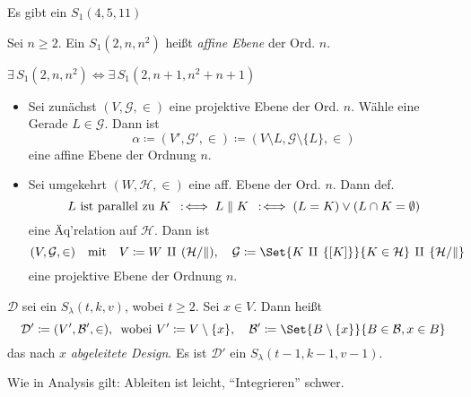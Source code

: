 \documentclass{cheat-sheet}
\newcommand{\Design}{\mathcal{D}} %
\newcommand{\Blocks}{\mathcal{B}} %
\newcommand{\Geraden}{\mathcal{G}} %
\begin{document}
\begin{satz}
  Es gibt ein $S_1(4, 5, 11)$
\end{satz}


\begin{defn}
  Sei $n \geq 2$.
  Ein $S_1(2, n, n^2)$ heißt \emph{affine Ebene} der Ord. $n$.
\end{defn}

\begin{satz}
  $\exists \, S_1(2, n, n^2) \iff \exists \, S_1(2, n+1, n^2 + n + 1)$
\end{satz}

\begin{konstr}
  \begin{itemize}
    \item Sei zunächst $(V, \Geraden, \in)$ eine projektive Ebene der Ord. $n$.
    Wähle eine Gerade $L \in \Geraden$.
    Dann ist
    \[ \alpha \coloneqq (V', \Geraden', \in) \coloneqq (V \setminus L, \Geraden \setminus \{ L \}, \in) \]
    eine affine Ebene der Ordnung $n$. \\
    \item Sei umgekehrt $(W, \mathcal{H}, \in)$ eine aff. Ebene der Ord. $n$.
    Dann def.
    \[ L \text{ ist parallel zu } K \enspace:\!\iff L \parallel K \enspace:\!\iff (L = K) \vee (L \cap K = \emptyset) \]
    eine Äq'relation auf $\mathcal{H}$.
    Dann ist
    \[
      (V, \Geraden, \in)
      \quad \text{mit} \quad
      V \coloneqq W \,\amalg\, (\mathcal{H}/{\parallel}), \quad
      \Geraden \coloneqq \Set{K \,\amalg\, \{ [K] \}}{K \in \mathcal{H}} \,\amalg\, \{ \mathcal{H}/{\parallel} \}
    \]
    eine projektive Ebene der Ordnung $n$.
  \end{itemize}
\end{konstr}

\begin{defn}
  $\Design$ sei ein $S_\lambda(t, k, v)$, wobei $t \geq 2$.
  Sei $x \in V$.
  Dann heißt
  \[
    \Design' \coloneqq (V', \Blocks', \in),
    \enspace \text{wobei } V' \coloneqq V \setminus \{ x \},
    \quad \Blocks' \coloneqq \Set{B \setminus \{ x \}}{B \in \Blocks, x \in B}
  \]
  das nach $x$ \emph{abgeleitete Design}.
  Es ist $\Design'$ ein $S_\lambda(t-1, k-1, v-1)$.
\end{defn}

\begin{bem}
  Wie in Analysis gilt: Ableiten ist leicht, "`Integrieren"' schwer.
\end{bem}
\end{document}
